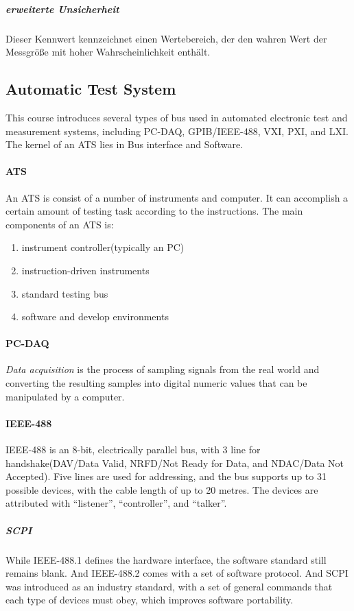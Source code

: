 \subparagraph{erweiterte Unsicherheit} Dieser Kennwert kennzeichnet einen Wertebereich, der den wahren Wert der Messgröße mit hoher Wahrscheinlichkeit enthält.

\subsection{Automatic Test System}
This course introduces several types of bus used in automated electronic test and measurement systems, including PC-DAQ, GPIB/IEEE-488, VXI, PXI, and LXI. The kernel of an ATS lies in Bus interface and Software.

\paragraph{ATS} An ATS is consist of a number of instruments and computer. It can accomplish a certain amount of testing task according to the instructions. The main components of an ATS is:

\begin{enumerate}
  \item instrument controller(typically an PC)
  \item instruction-driven instruments
  \item standard testing bus
  \item software and develop environments
\end{enumerate}

\paragraph{PC-DAQ} \emph{Data acquisition} is the process of sampling signals from the real world and converting the resulting samples into digital numeric values that can be manipulated by a computer.

\paragraph{IEEE-488} IEEE-488 is an 8-bit, electrically parallel bus, with 3 line for handshake(DAV/Data Valid, NRFD/Not Ready for Data, and NDAC/Data Not Accepted). Five lines are used for addressing, and the bus supports up to 31 possible devices, with the cable length of up to 20 metres. The devices are attributed with ``listener'', ``controller'', and ``talker''.

\subparagraph{SCPI} While IEEE-488.1 defines the hardware interface, the software standard still remains blank. And IEEE-488.2 comes with a set of software protocol. And SCPI was introduced as an industry standard, with a set of general commands that each type of devices must obey, which improves software portability.

